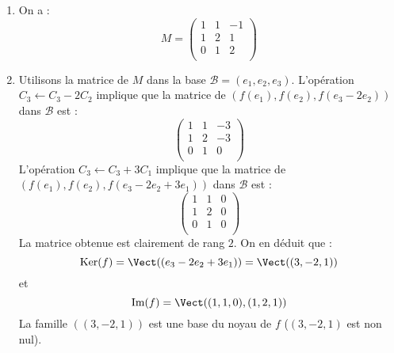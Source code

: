 \documentclass[a4paper,twoside,french,11pt]{VcCours}
\begin{document}
\begin{enumerate}
\item On a :
$$ M  = \begin{pmatrix}
1  & 1 & - 1 \\
1  & 2 & 1  \\
0  & 1 & 2 \\
\end{pmatrix}$$
\item Utilisons la matrice de $M$ dans la base $\mathcal{B}=(e_1,e_2,e_3)$. L'opération $C_3 \leftarrow C_3-2C_2$ implique que la matrice de $(f(e_1),f(e_2),f(e_3-2e_2))$ dans $\mathcal{B}$ est :
$$ \begin{pmatrix}
1  & 1 & - 3 \\
1  & 2 & -3  \\
0  & 1 & 0 \\
\end{pmatrix}$$
L'opération $C_3 \leftarrow C_3+3C_1$ implique que la matrice de $(f(e_1),f(e_2),f(e_3-2e_2+3e_1))$ dans $\mathcal{B}$ est :
$$ \begin{pmatrix}
1  & 1 & 0 \\
1  & 2 & 0  \\
0  & 1 & 0 \\
\end{pmatrix}$$
La matrice obtenue est clairement de rang $2$. On en déduit que :
$$ \textrm{Ker}(f) = \Vect((e_3-2e_2+3e_1)) = \Vect((3,-2,1))$$
et 
$$ \textrm{Im}(f) = \Vect((1,1,0),(1,2,1))$$
La famille $((3,-2,1))$ est une base du noyau de $f$ ($(3,-2,1)$ est non nul). 


\end{enumerate}
\end{document}

